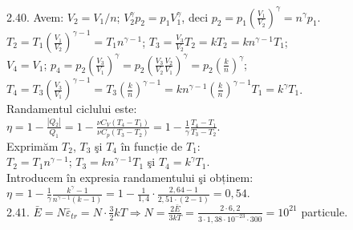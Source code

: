2.40. Avem: $V_{2}=V_{1} / n$; \quad $V_{2}^{\gamma} p_{2}=p_{1} V_{1}^{\gamma}$, deci $p_{2}=p_{1}\left(\frac{V_{1}}{V_{2}}\right)^{\gamma}=n^{\gamma} p_{1}$.\\ $T_{2}=T_{1}\left(\frac{V_{1}}{V_{2}}\right)^{\gamma-1}=T_{1} n^{\gamma-1}$; \quad $T_{3}=\frac{V_{3}}{V_{2}} T_{2}=k T_{2}=k n^{\gamma-1} T_{1}$;\\ $V_{4}=V_{1}$; \quad $p_{4}=p_{2}\left(\frac{V_{3}}{V_{1}}\right)^{\gamma}=p_{2}\left(\frac{V_{3}}{V_{2}} \frac{V_{2}}{V_{1}}\right)^{\gamma}=p_{2}\left(\frac{k}{n}\right)^{\gamma}$;\\ $T_{4}=T_{3}\left(\frac{V_{3}}{V_{1}}\right)^{\gamma-1}=T_{3}\left(\frac{k}{n}\right)^{\gamma-1}=k n^{\gamma-1}\left(\frac{k}{n}\right)^{\gamma-1} T_{1}=k^{\gamma} T_{1}$.\\ Randamentul ciclului este:\\ $\eta=1-\frac{\left|Q_{2}\right|}{Q_{1}}=1-\frac{\nu C_{V}\left(T_{4}-T_{1}\right)}{\nu C_{p}\left(T_{3}-T_{2}\right)}=1-\frac{1}{\gamma} \frac{T_{4}-T_{1}}{T_{3}-T_{2}}$.\\ Exprimăm $T_{2}$, $T_{3}$ şi $T_{4}$ în funcție de $T_{1}$:\\ $T_{2}=T_{1} n^{\gamma-1}$; $T_{3}=k n^{\gamma-1} T_{1}$ şi $T_{4}=k^{\gamma} T_{1}$.\\ Introducem în expresia randamentului şi obținem:\\ $\eta=1-\frac{1}{\gamma} \frac{k^{\gamma}-1}{n^{\gamma-1}(k-1)}=1-\frac{1}{1,4} \cdot \frac{2,64-1}{2,51 \cdot(2-1)}=0,54$.\\

2.41. $\bar{E}=N \bar{\varepsilon}_{t r}=N \cdot \frac{3}{2} k T \Rightarrow N=\frac{2 \bar{E}}{3 k T}=\frac{2 \cdot 6,2}{3 \cdot 1,38 \cdot 10^{-23} \cdot 300}=10^{21}$ particule.\\

